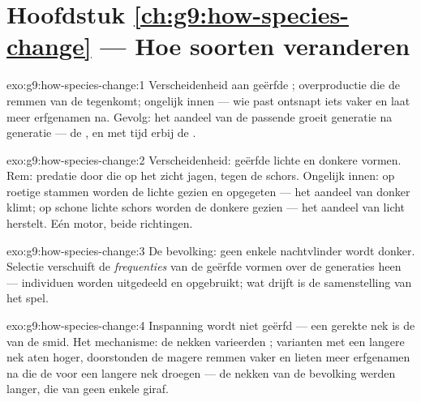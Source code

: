 \section*{Hoofdstuk \ref{ch:g9:how-species-change} --- Hoe soorten veranderen}

\begin{solution}{exo:g9:how-species-change:1}
Verscheidenheid aan geërfde ; overproductie die de remmen
van de  tegenkomt; ongelijk innen --- wie past ontsnapt
iets vaker en laat meer erfgenamen na. Gevolg: het aandeel van de
passende  groeit generatie na generatie --- de , en met tijd erbij de .
\end{solution}

\begin{solution}{exo:g9:how-species-change:2}
Verscheidenheid: geërfde lichte en donkere vormen. Rem: predatie
door  die op het zicht jagen, tegen de schors. Ongelijk
innen: op roetige stammen worden de lichte gezien en opgegeten ---
het aandeel van donker klimt; op schone lichte schors worden de
donkere gezien --- het aandeel van licht herstelt. Eén motor, beide
richtingen.
\end{solution}

\begin{solution}{exo:g9:how-species-change:3}
De bevolking: geen enkele nachtvlinder wordt donker. Selectie
verschuift de \emph{frequenties} van de geërfde vormen over de
generaties heen --- individuen worden uitgedeeld en opgebruikt; wat
drijft is de samenstelling van het spel.
\end{solution}

\begin{solution}{exo:g9:how-species-change:4}
Inspanning wordt niet geërfd --- een gerekte nek is de  van de
smid. Het mechanisme: de nekken varieerden ; varianten met
een langere nek aten hoger, doorstonden de magere remmen vaker en
lieten meer erfgenamen na die de  voor een langere nek
droegen --- de nekken van de bevolking werden langer, die van geen
enkele giraf.
\end{solution}

